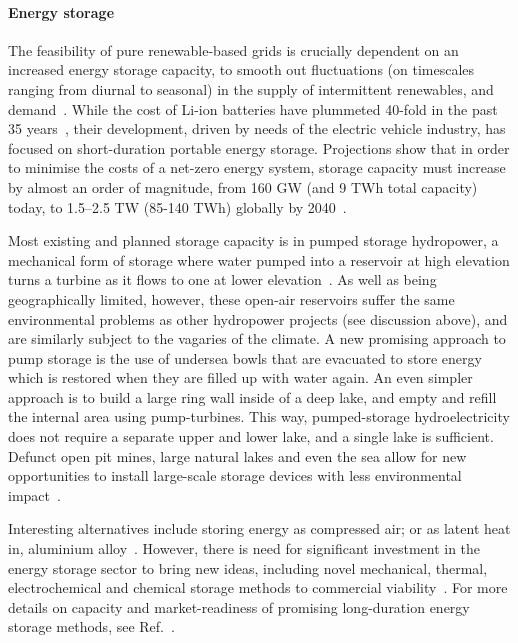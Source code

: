 \documentclass[../SustainableHEP.tex]{subfiles}
\begin{document}
\paragraph{Energy storage}
The feasibility of pure renewable-based grids is crucially dependent on an increased energy storage capacity, to smooth out fluctuations (on timescales ranging from diurnal to seasonal) in the supply of intermittent renewables, and demand~\cite{LDESEnergyStorage}.  While the cost of Li-ion batteries have plummeted 40-fold in the past 35 years~\cite{Ziegler_2020}, their development, driven by needs of the electric vehicle industry, has focused on short-duration portable energy storage.  Projections show that in order to minimise the costs of a net-zero energy system, storage capacity must increase by almost an order of magnitude, from 160 GW (and 9 TWh total capacity) today, to 1.5--2.5 TW (85-140 TWh) globally  by 2040~\cite{LDESEnergyStorage}.  

Most existing and planned storage capacity is in pumped storage hydropower, a mechanical form of storage where water pumped into a reservoir at high elevation turns a turbine as it flows to one at lower elevation~\cite{LDESEnergyStorage}.  As well as being geographically limited, however, these open-air reservoirs suffer the same environmental problems as other hydropower projects (see discussion above), and are similarly subject to the vagaries of the climate. 
A new promising approach to pump storage is the use of undersea bowls that are evacuated to store energy which is restored when they are filled up with water again. An even simpler approach is to build a large ring wall inside of a deep lake, and empty and refill the internal area using pump-turbines. This way, pumped-storage hydroelectricity does not require a separate upper and lower lake, and a single lake is sufficient.
Defunct open pit mines, large natural lakes and even the sea allow for new opportunities to install large-scale storage devices with less environmental impact~\cite{Dueren,pumpstorage}.  

Interesting alternatives include storing energy as compressed air; or as latent heat in, \eg aluminium alloy~\cite{LDESEnergyStorage}.
However, there is need for significant investment in the energy storage sector to bring new ideas, including novel mechanical, thermal, electrochemical and chemical storage methods to commercial viability~\cite{LDESEnergyStorage}.    For more details on capacity and market-readiness of promising long-duration energy storage methods, see Ref.~\cite{LDESEnergyStorage}.
\end{document}
